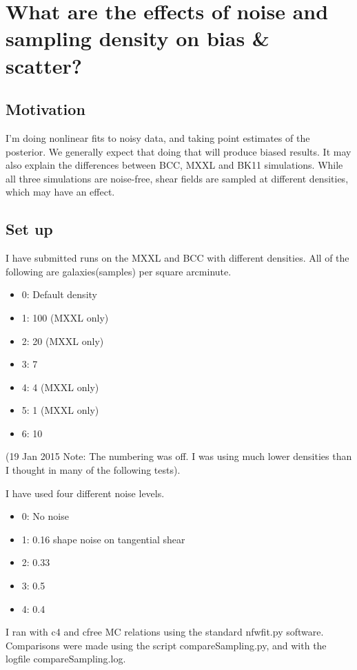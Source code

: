 \documentclass[11pt]{article}
\begin{document}
\section{What are the effects of noise and sampling density on bias \& scatter?}
\label{sec:noisebias}

\subsection{Motivation}
I'm doing nonlinear fits to noisy data, and taking point estimates of the posterior. We generally expect that doing that will produce biased results. It may also explain the differences between BCC, MXXL and BK11 simulations. While all three simulations are noise-free, shear fields are sampled at different densities, which may have an effect.

\subsection{Set up}

I have submitted runs on the MXXL and BCC with different densities. All of the following are galaxies(samples) per square arcminute.
\begin{itemize}
\item 0: Default density
\item 1: 100 (MXXL only)
\item 2: 20 (MXXL only)
\item 3: 7
\item 4: 4  (MXXL only)
\item 5: 1  (MXXL only)
\item 6: 10
\end{itemize}
(19 Jan 2015 Note: The numbering was off. I was using much lower densities than I thought in many of the following tests).

I have used four different noise levels.
\begin{itemize}
\item 0: No noise
\item 1: 0.16 shape noise on tangential shear
\item 2: 0.33
\item 3: 0.5
\item 4: 0.4
\end{itemize}

I ran with c4 and cfree MC relations using the standard nfwfit.py software. Comparisons were made using the script compareSampling.py, and with the logfile compareSampling.log.
\end{document}
